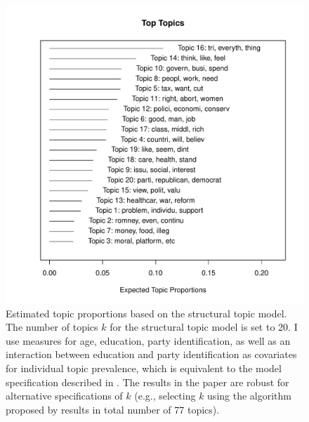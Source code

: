 \documentclass[12pt]{article}
\begin{document}
\begin{figure}[h]\centering
\includegraphics[scale=.5]{../fig/stm_prop.pdf}
\caption{Estimated topic proportions based on the structural topic model. The number of topics $k$ for the structural topic model is set to 20. I use measures for age, education, party identification, as well as an interaction between education and party identification as covariates for individual topic prevalence, which is equivalent to the model specification described in \citet{roberts2014structural}. The results in the paper are robust for alternative specifications of $k$ (e.g., selecting $k$ using the algorithm proposed by \citet{lee2014low} results in total number of 77 topics).}\label{fig:stm_prop}
\end{figure}
\end{document}
